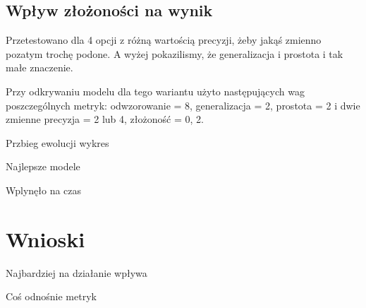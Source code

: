 \subsection{Wpływ złożoności na wynik}
Przetestowano dla 4 opcji z różną wartością precyzji, żeby jakąś zmienno pozatym trochę  podone. A wyżej pokazilismy, że generalizacja i prostota i tak małe znaczenie.

Przy odkrywaniu modelu dla tego wariantu użyto następujących wag poszczególnych metryk: odwzorowanie = 8, generalizacja = 2, prostota = 2 i dwie zmienne precyzja = 2 lub 4, złożoność = 0, 2.

Przbieg ewolucji wykres

Najlepsze modele

Wplynęło na czas
\section{Wnioski}
Najbardziej na działanie wpływa

Coś odnośnie metryk
